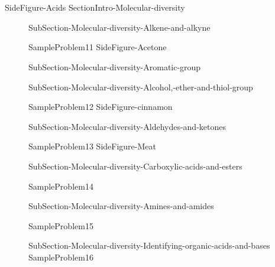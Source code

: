 \documentclass[main.tex]{subfiles}
\begin{document}
\section{\color{blue!30!black}{Molecular diversity}}
{SideFigure-Acids}
 {SectionIntro-Molecular-diversity}\sloppy
\begin{description}
\item[]{SubSection-Molecular-diversity-Alkene-and-alkyne}

{SampleProblem11}
 {SideFigure-Acetone}

 \item[]{SubSection-Molecular-diversity-Aromatic-group}
 \newpage\vspace{5cm}{Table-Functional-groups}


\item[]{SubSection-Molecular-diversity-Alcohol,-ether-and-thiol-group}

{SampleProblem12}
{SideFigure-cinnamon}

\item[] {SubSection-Molecular-diversity-Aldehydes-and-ketones}

{SampleProblem13}
 {SideFigure-Meat}

\item[]{SubSection-Molecular-diversity-Carboxylic-acids-and-esters}

{SampleProblem14}

 \item[] {SubSection-Molecular-diversity-Amines-and-amides}

{SampleProblem15}
\item[]{SubSection-Molecular-diversity-Identifying-organic-acids-and-bases}
{SampleProblem16}

 \end{description}



\clearpage\thispagestyle{empty}\mbox{}\clearpage
\end{document}
